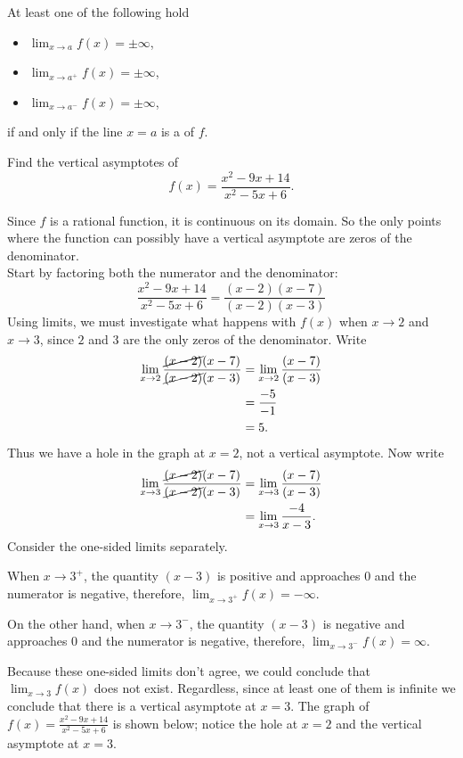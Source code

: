 \documentclass{ximera}
\begin{document}
\begin{definition}\label{def:vert asymptote}
At least one of the following hold
\begin{itemize}
\item $\lim_{x\to a} f(x) = \pm\infty$,
\item $\lim_{x\to a^+} f(x) = \pm\infty$,
\item $\lim_{x\to a^-} f(x) = \pm\infty$,
\end{itemize}
if and only if the line $x=a$ is a  of $f$.
\end{definition}


\begin{example}
Find the vertical asymptotes of 
\[
f(x) = \frac{x^2-9x+14}{x^2-5x+6}.
\]

\begin{explanation}
Since $f$ is a rational function, it is continuous on its domain. So the only points where the function can possibly have a vertical asymptote are zeros of the denominator. \\
Start by factoring both the numerator and the denominator:
\[
\frac{x^2-9x+14}{x^2-5x+6} = \frac{(x-2)(x-7)}{(x-2)(x-3)}
\]
Using limits, we must investigate what happens with $ f(x)$ when $x\to 2$ and $x\to 3$, since $2$ and $3$ are the only zeros of the denominator. Write
\begin{align*}
\lim_{x\to 2} \frac{\cancel{(x-2)}(x-7)}{\cancel{(x-2)}(x-3)} &= \lim_{x\to 2} \frac{(x-7)}{(x-3)}\\
&= \frac{-5}{-1}\\
&=5.
\end{align*}
Thus we have a hole in the graph at $x=2$, not a vertical asymptote.
Now write
\begin{align*}
\lim_{x\to 3} \frac{\cancel{(x-2)}(x-7)}{\cancel{(x-2)}(x-3)} &= \lim_{x\to 3} \frac{(x-7)}{(x-3)}\\
&= \lim_{x\to 3}\frac{-4}{x-3}.
\end{align*}
Consider the one-sided limits separately. 

 When $x\to 3^+$, the quantity $
(x-3)$ is positive and approaches $0$ and the numerator is negative, therefore, 
$\lim_{x\to 3^+} f(x) = -\infty$.

 On the other hand,  when $x\to 3^-$, the quantity $
(x-3)$ is negative and approaches $0$ and the numerator is negative, therefore, 
$\lim_{x\to 3^-} f(x) = \infty$.

Because these one-sided limits don't agree, we could conclude that $\lim_{x\to 3} f(x)$ does not exist. Regardless, since at least one of them is infinite we conclude that there is a vertical asymptote at $x=3$. The graph of $f(x) = \frac{x^2-9x+14}{x^2-5x+6}$ is shown below; notice the hole at $x=2$ and the vertical asymptote at $x=3$.


\end{explanation}
\end{example}
\end{document}
